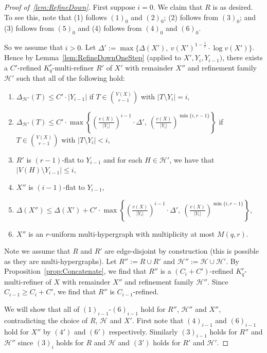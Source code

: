 \documentclass[11pt]{article}
\newcounter{i}
\theoremstyle{plain}
\renewcommand{\theclaim}{\thetheorem.\arabic{claim}}
\newenvironment{lateproof}[1]
 {%
  \renewcommand{\theclaim}{\ref{#1}.\arabic{claim}}%
  \begin{proof}[Proof of~\cref{#1}]%
 }
 {\end{proof}}
\theoremstyle{plain} %
\theoremstyle{definition}
\begin{document}
\begin{lateproof}{lem:RefineDown}
First suppose $i=0$. We claim that $R$ is as desired. To see this, note that (1) follows $(1)_0$ and $(2)_0$; (2) follows from $(3)_0$; and (3) follows from $(5)_0$ and (4) follows from $(4)_0$ and $(6)_0$.

So we assume that $i>0$. Let $\Delta':= \max\{\Delta(X'),~v(X')^{1-\frac{1}{r}}\cdot \log v(X')\}$. Hence by Lemma~\ref{lem:RefineDownOneStep} (applied to $X',Y_i,Y_{i-1})$, there exists a $C'$-refined $K_q^r$-multi-refiner $R'$ of $X'$ with remainder $X''$ and refinement family $\mathcal{H}'$ such that all of the following hold:

\begin{enumerate}
    \item[($1^{\prime}$)] $\Delta_{\mathcal{H'}}(T) \le C' \cdot |Y_{i-1}|$ if $T\in \binom{V(X)}{r-1}$ with $|T\setminus Y_i|=i$,
    \item[($2^{\prime}$)] $\Delta_{\mathcal{H'}}(T) \le C' \cdot \max\left\{\left(\frac{v(X)}{|Y_i|}\right)^{i-1} \cdot \Delta',~\left(\frac{v(X)}{|Y_i|}\right)^{\min\{i,r-1\}}\right\}$ if $T\in \binom{V(X)}{r-1}$ with $|T\setminus Y_i|<i$,
    \item[($3^{\prime}$)] $R'$ is $(r-1)$-flat to $Y_{i-1}$ and for each $H\in \mathcal{H}'$, we have that %
    $|V(H)\setminus Y_{i-1}| \le i$,
    \item[($4^{\prime}$)]   $X''$ is $(i-1)$-flat to $Y_{i-1}$,
    \item[($5^{\prime}$)] $\Delta(X'')\le \Delta(X')+C' \cdot \max\left\{\left(\frac{v(X)}{|Y_i|}\right)^{i-1} \cdot \Delta',~\left(\frac{v(X)}{|Y_i|}\right)^{\min\{i,r-1\}}\right\}$,
    \item[($6^{\prime}$)] $X''$ is an $r$-uniform multi-hypergraph with multiplicity at most $M(q,r)$. 
\end{enumerate}          

Note we assume that $R$ and $R'$ are edge-disjoint by construction (this is possible as they are multi-hypergraphs). Let $R'':= R\cup R'$ and $\mathcal{H}'':=\mathcal{H}\cup\mathcal{H}'$.
By Proposition~\ref{prop:Concatenate}, we find that $R''$ is a $(C_i+C')$-refined $K_q^r$-multi-refiner of $X$ with remainder $X''$ and refinement family $\mathcal{H}''$. Since $C_{i-1}\ge C_i+C'$, we find that $R''$ is $C_{i-1}$-refined.

We will show that all of $(1)_{i-1}$-$(6)_{i-1}$ hold for $R''$, $\mathcal{H}''$ and $X''$, contradicting the choice of $R$, $\mathcal{H}$ and $X'$. First note that $(4)_{i-1}$ and $(6)_{i-1}$ hold for $X''$ by $(4')$ and $(6')$ respectively. Similarly $(3)_{i-1}$ holds for $R''$ and $\mathcal{H}''$ since $(3)_i$ holds for $R$ and $\mathcal{H}$ and $(3')$ holds for $R'$ and $\mathcal{H}'$. 



\end{lateproof}
\end{document}
